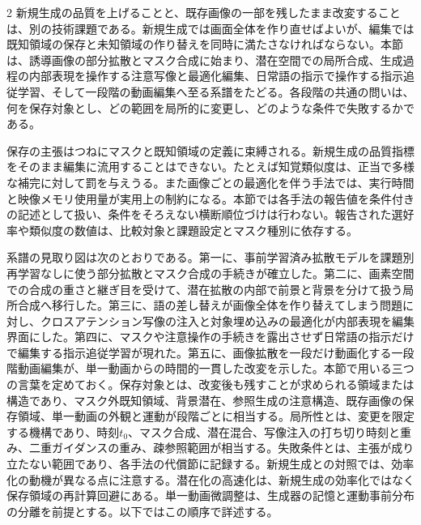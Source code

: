 \documentclass[lualatex,a4paper,10pt]{jlreq}
\begin{document}
\begin{multicols}{2}
\raggedcolumns
新規生成の品質を上げることと、既存画像の一部を残したまま改変することは、別の技術課題である。新規生成では画面全体を作り直せばよいが、編集では既知領域の保存と未知領域の作り替えを同時に満たさなければならない。本節は、誘導画像の部分拡散とマスク合成に始まり、潜在空間での局所合成、生成過程の内部表現を操作する注意写像と最適化編集、日常語の指示で操作する指示追従学習、そして一段階の動画編集へ至る系譜をたどる\autocite{btd044,btd045,btd046}。各段階の共通の問いは、何を保存対象とし、どの範囲を局所的に変更し、どのような条件で失敗するかである。

保存の主張はつねにマスクと既知領域の定義に束縛される。新規生成の品質指標をそのまま編集に流用することはできない。たとえば知覚類似度は、正当で多様な補完に対して罰を与えうる\autocite{btd045}。また画像ごとの最適化を伴う手法では、実行時間と映像メモリ使用量が実用上の制約になる\autocite{btd046,btd048}。本節では各手法の報告値を条件付きの記述として扱い、条件をそろえない横断順位づけは行わない。報告された選好率や類似度の数値は、比較対象と課題設定とマスク種別に依存する\autocite{btd044,btd045}。

系譜の見取り図は次のとおりである。第一に、事前学習済み拡散モデルを課題別再学習なしに使う部分拡散とマスク合成の手続きが確立した\autocite{btd044,btd045}。第二に、画素空間での合成の重さと継ぎ目を受けて、潜在拡散の内部で前景と背景を分けて扱う局所合成へ移行した\autocite{btd046}。第三に、語の差し替えが画像全体を作り替えてしまう問題に対し、クロスアテンション写像の注入と対象埋め込みの最適化が内部表現を編集界面にした\autocite{btd047,btd048}。第四に、マスクや注意操作の手続きを露出させず日常語の指示だけで編集する指示追従学習が現れた\autocite{btd049}。第五に、画像拡散を一段だけ動画化する一段階動画編集が、単一動画からの時間的一貫した改変を示した\autocite{btd050}。本節で用いる三つの言葉を定めておく。保存対象とは、改変後も残すことが求められる領域または構造であり、マスク外既知領域、背景潜在、参照生成の注意構造、既存画像の保存領域、単一動画の外観と運動が段階ごとに相当する\autocite{btd044,btd045,btd046,btd047,btd048,btd049,btd050}。局所性とは、変更を限定する機構であり、時刻$t_0$、マスク合成、潜在混合、写像注入の打ち切り時刻と重み、二重ガイダンスの重み、疎参照範囲が相当する\autocite{btd044,btd045,btd046,btd047,btd049,btd050}。失敗条件とは、主張が成り立たない範囲であり、各手法の代償節に記録する\autocite{btd044,btd045,btd046,btd047,btd048,btd049,btd050}。新規生成との対照では、効率化の動機が異なる点に注意する。潜在化の高速化は、新規生成の効率化ではなく保存領域の再計算回避にある\autocite{btd046}。単一動画微調整は、生成器の記憶と運動事前分布の分離を前提とする\autocite{btd050}。以下ではこの順序で詳述する。
\end{multicols}
\end{document}
